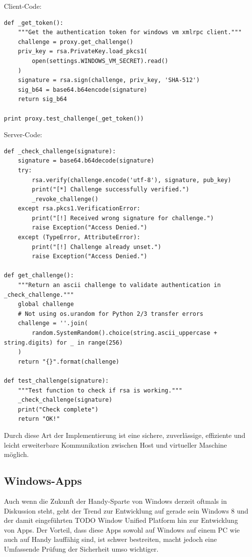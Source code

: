 Client-Code:
\begin{lstlisting}
def _get_token():
    """Get the authentication token for windows vm xmlrpc client."""
    challenge = proxy.get_challenge()
    priv_key = rsa.PrivateKey.load_pkcs1(
        open(settings.WINDOWS_VM_SECRET).read()
    )
    signature = rsa.sign(challenge, priv_key, 'SHA-512')
    sig_b64 = base64.b64encode(signature)
    return sig_b64
    
print proxy.test_challenge(_get_token())
\end{lstlisting}
\newpage
Server-Code:
\begin{lstlisting}
def _check_challenge(signature):
    signature = base64.b64decode(signature)
    try:
        rsa.verify(challenge.encode('utf-8'), signature, pub_key)
        print("[*] Challenge successfully verified.")
        _revoke_challenge()
    except rsa.pkcs1.VerificationError:
        print("[!] Received wrong signature for challenge.")
        raise Exception("Access Denied.")
    except (TypeError, AttributeError):
        print("[!] Challenge already unset.")
        raise Exception("Access Denied.")

def get_challenge():
    """Return an ascii challenge to validate authentication in _check_challenge."""
    global challenge
    # Not using os.urandom for Python 2/3 transfer errors
    challenge = ''.join(
        random.SystemRandom().choice(string.ascii_uppercase + string.digits) for _ in range(256)
    )
    return "{}".format(challenge)
    
def test_challenge(signature):
    """Test function to check if rsa is working."""
    _check_challenge(signature)
    print("Check complete")
    return "OK!"
\end{lstlisting}
Durch diese Art der Implementierung ist eine sichere, zuverlässige, effiziente und leicht erweiterbare Kommunikation zwischen Host und virtueller Maschine möglich.


\subsection{Windows-Apps}
\label{Windows-Apps}
Auch wenn die Zukunft der Handy-Sparte von Windows derzeit oftmals in Diskussion steht, geht der Trend zur Entwicklung auf gerade sein Windows 8 und der damit eingeführten TODO Window Unified Platform hin zur Entwicklung von Apps. Der Vorteil, dass diese Apps sowohl auf Windows auf einem PC wie auch auf Handy lauffähig sind, ist schwer bestreiten, macht jedoch eine Umfassende Prüfung der Sicherheit umso wichtiger.\\

